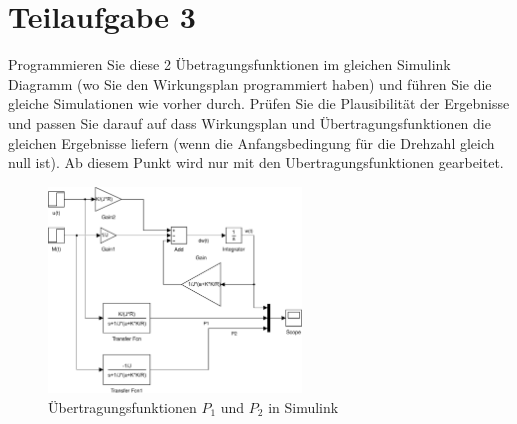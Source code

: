 \section{Teilaufgabe 3}
\begin{aufgabe}
    Programmieren Sie diese 2 Übetragungsfunktionen im gleichen Simulink 
    Diagramm (wo Sie den Wirkungsplan programmiert haben) und führen Sie die 
    gleiche Simulationen wie vorher durch. Prüfen Sie die Plausibilität der 
    Ergebnisse und passen Sie darauf auf dass Wirkungsplan und 
    Übertragungsfunktionen die gleichen Ergebnisse liefern (wenn die 
    Anfangsbedingung für die Drehzahl gleich null ist). Ab diesem Punkt wird 
    nur mit den Ubertragungsfunktionen gearbeitet.
\end{aufgabe}
\begin{figure}[h!]
    \centering
    \includegraphics[width=0.6\textwidth]{03/transfer.pdf}
    \caption{Übertragungsfunktionen $P_1$ und $P_2$ in Simulink}
    \label{fig:03}
\end{figure}
